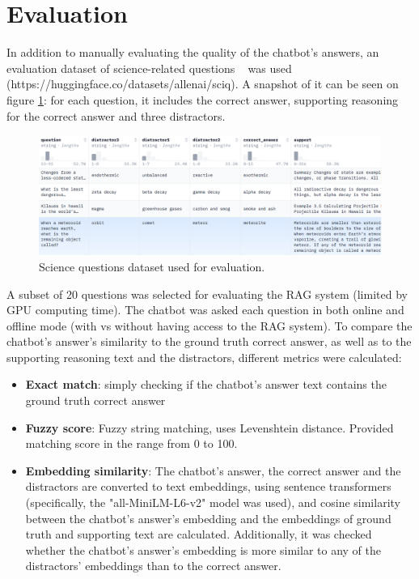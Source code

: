 \documentclass[fleqn,moreauthors,10pt]{ds_report}
\begin{document}
\section*{Evaluation}

In addition to manually evaluating the quality of the chatbot's answers, an evaluation dataset of science-related questions ~\cite{SciQ} was used (https://huggingface.co/datasets/allenai/sciq). A snapshot of it can be seen on figure \ref{fig:evaluation_dataset}: for each question, it includes the correct answer, supporting reasoning for the correct answer and three distractors.

\begin{figure}[ht]\centering 
	\includegraphics[width=1\linewidth]{images/evaluation_dataset.PNG}
	\caption{Science questions dataset used for evaluation.}
	\label{fig:evaluation_dataset}
\end{figure}

A subset of 20 questions was selected for evaluating the RAG system (limited by GPU computing time). The chatbot was asked each question in both online and offline mode (with vs without having access to the RAG system). To compare the chatbot's answer's similarity to the ground truth correct answer, as well as to the supporting reasoning text and the distractors, different metrics were calculated:

\begin{itemize}
    \item \textbf{Exact match}: simply checking if the chatbot's answer text contains the ground truth correct answer
    \item \textbf{Fuzzy score}: Fuzzy string matching, uses Levenshtein distance. Provided matching score in the range from 0 to 100.
    \item \textbf{Embedding similarity}: The chatbot's answer, the correct answer and the distractors are converted to text embeddings, using sentence transformers (specifically, the "all-MiniLM-L6-v2" model was used), and cosine similarity between the chatbot's answer's embedding and the embeddings of ground truth and supporting text are calculated. Additionally, it was checked whether the chatbot's answer's embedding is more similar to any of the distractors' embeddings than to the correct answer.
\end{itemize}
\end{document}

